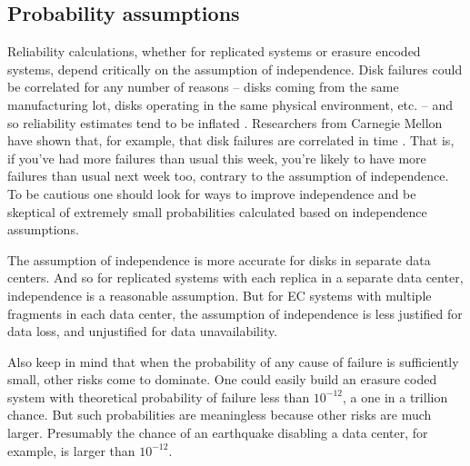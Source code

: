 \subsection{Probability assumptions}

Reliability calculations, whether for replicated systems or erasure encoded systems, depend critically on the assumption of independence. Disk failures could be correlated for any number of reasons -- disks coming from the same manufacturing lot, disks operating in the same physical environment, etc. -- and so reliability estimates tend to be inflated \cite{goog}. Researchers from Carnegie Mellon have shown that, for example, that disk failures are correlated in time \cite{cmu}. That is, if you've had more failures than usual this week, you're likely to have more failures than usual next week too, contrary to the assumption of independence. To be cautious one should look for ways to improve independence and be skeptical of extremely small probabilities calculated based on independence assumptions. 

The assumption of independence is more accurate for disks in separate data centers. And so for replicated systems with each replica in a separate data center, independence is a reasonable assumption. But for EC systems with multiple fragments in each data center, the assumption of independence is less justified for data loss, and unjustified for data unavailability.

Also keep in mind that when the probability of any cause of failure is sufficiently small, other risks come to dominate. One could easily build an erasure coded system with theoretical probability of failure less than $10^{-12}$, a one in a trillion chance. But such probabilities are meaningless because other risks are much larger. Presumably the chance of an earthquake disabling a data center, for example, is larger than $10^{-12}$.

